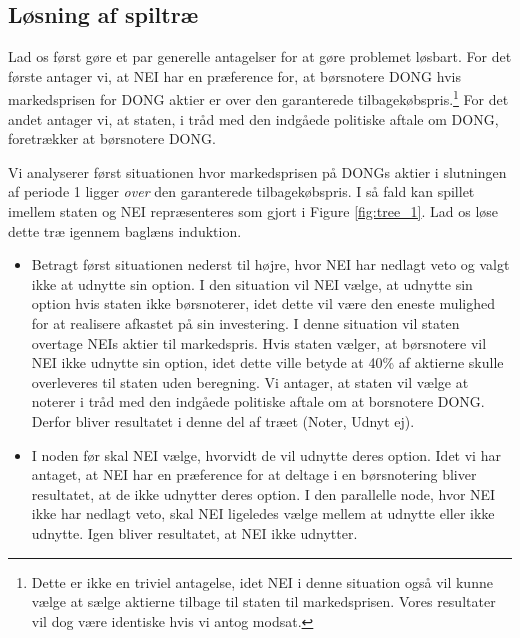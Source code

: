 \documentclass{article}
\begin{document}
\newpage

\FloatBarrier

\begin{appendices}
\renewcommand\appendixname{Appendix}

\section{Løsning af spiltræ}
\label{sec:app_tree}
Lad os først gøre et par generelle antagelser for at gøre problemet løsbart. For det første antager vi, at NEI har en præference for, at børsnotere DONG hvis markedsprisen for DONG aktier er over den garanterede tilbagekøbspris.\footnote{Dette er ikke en triviel antagelse, idet NEI i denne situation også vil kunne vælge at sælge aktierne tilbage til staten til markedsprisen. Vores resultater vil dog være identiske hvis vi antog modsat.} For det andet antager vi, at staten, i tråd med den indgåede politiske aftale om DONG, foretrækker at børsnotere DONG. %

Vi analyserer først situationen hvor markedsprisen på DONGs aktier i slutningen af periode 1 ligger \textit{over} den garanterede tilbagekøbspris. I så fald kan spillet imellem staten og NEI repræsenteres som gjort i Figure \ref{fig:tree_1}. Lad os løse dette træ igennem baglæns induktion.  

\begin{itemize}

	\item Betragt først situationen nederst til højre, hvor NEI har nedlagt veto og valgt ikke at udnytte sin option. I den situation vil NEI vælge, at udnytte sin option hvis staten ikke børsnoterer, idet dette vil være den eneste mulighed for at realisere afkastet på sin investering. I denne situation vil staten overtage NEIs aktier til markedspris. Hvis staten vælger, at børsnotere vil NEI ikke udnytte sin option, idet dette ville betyde at 40\% af aktierne skulle overleveres til staten uden beregning. Vi antager, at staten vil vælge at noterer i tråd med den indgåede politiske aftale om at borsnotere DONG. Derfor bliver resultatet i denne del af træet (Noter, Udnyt ej).

	\item I noden før skal NEI vælge, hvorvidt de vil udnytte deres option. Idet vi har antaget, at NEI har en præference for at deltage i en børsnotering bliver resultatet, at de ikke udnytter deres option. I den parallelle node, hvor NEI ikke har nedlagt veto, skal NEI ligeledes vælge mellem at udnytte eller ikke udnytte. Igen bliver resultatet, at NEI ikke udnytter.
	

\end{itemize}
\end{appendices}
\end{document}
